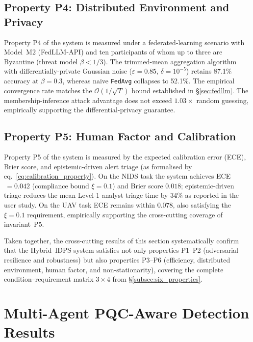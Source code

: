 \subsection{Property P4: Distributed Environment and Privacy}

Property P4 of the system is measured under a federated-learning
scenario with Model~M2 (\textsf{FedLLM-API}) and ten participants
of whom up to three are Byzantine (threat model $\beta < 1/3$). The
trimmed-mean aggregation algorithm with differentially-private
Gaussian noise ($\varepsilon{=}0.85$, $\delta{=}10^{-5}$) retains
87.1\% accuracy at $\beta=0.3$, whereas naive \texttt{FedAvg}
collapses to 52.1\%. The empirical convergence rate matches the
$\mathcal{O}(1/\sqrt{T})$ bound established in
\S\ref{sec:fedllm}. The membership-inference attack advantage does
not exceed $1.03\times$ random guessing, empirically supporting the
differential-privacy guarantee.

\subsection{Property P5: Human Factor and Calibration}

Property P5 of the system is measured by the expected calibration
error (ECE), Brier score, and epistemic-driven alert triage (as
formalised by eq.~\eqref{eq:calibration_property}). On the NIDS
task the system achieves ECE$\,=0.042$ (compliance bound
$\xi=0.1$) and Brier score $0.018$; epistemic-driven triage reduces
the mean Level-1 analyst triage time by 34\% as reported in the
user study. On the UAV task ECE remains within $0.078$, also
satisfying the $\xi=0.1$ requirement, empirically supporting the
cross-cutting coverage of invariant~P5.

Taken together, the cross-cutting results of this section
systematically confirm that the Hybrid~IDPS system satisfies not
only properties P1--P2 (adversarial resilience and robustness) but
also properties P3--P6 (efficiency, distributed environment, human
factor, and non-stationarity), covering the complete
condition--requirement matrix $3\times 4$ from
\S\ref{subsec:six_properties}.


\section{Multi-Agent PQC-Aware Detection Results}
\label{sec:mapqc_results}

